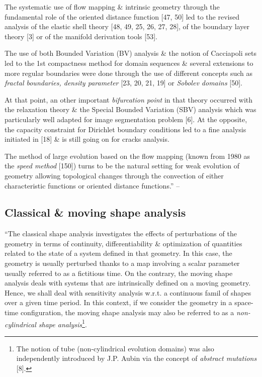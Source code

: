 \documentclass[oneside]{book}
\numberwithin{equation}{section}
\begin{document}
The systematic use of flow mapping \& intrinsic geometry through the fundamental role of the oriented distance function [47, 50] led to the revised analysis of the elastic shell theory [48, 49, 25, 26, 27, 28], of the boundary layer theory [3] or of the manifold derivation tools [53].

The use of both Bounded Variation (BV) analysis \& the notion of Cacciapoli sets led to the 1st compactness method for domain sequences \& several extensions to more regular boundaries were done through the use of different concepts such as \textit{fractal boundaries, density parameter} [23, 20, 21, 19] or \textit{Sobolev domains} [50].

At that point, an other important \textit{bifurcation point} in that theory occurred with the relaxation theory \& the Special Bounded Variation (SBV) analysis which was particularly well adapted for image segmentation problem [6]. At the opposite, the capacity constraint for Dirichlet boundary conditions led to a fine analysis initiated in [18] \& is still going on for cracks analysis.

The method of large evolution based on the flow mapping (known from 1980 as the \textit{speed method} [150]) turns to be the natural setting for weak evolution of geometry allowing topological changes through the convection of either characteristic functions or oriented distance functions.'' -- \cite[Chap. 1, pp. 1--3]{Moubachir_Zolesio2006}

\subsection{Classical \& moving shape analysis}
``The classical shape analysis investigates the effects of perturbations of the geometry in terms of continuity, differentiability \& optimization of quantities related to the state of a system defined in that geometry. In this case, the geometry is usually perturbed thanks to a map involving a scalar parameter usually referred to as a fictitious time. On the contrary, the moving shape analysis deals with systems that are intrinsically defined on a moving geometry. Hence, we shall deal with sensitivity analysis w.r.t. a continuous famil of shapes over a given time period. In this context, if we consider the geometry in a space-time configuration, the moving shape analysis may also be referred to as a \textit{non-cylindrical shape analysis}\footnote{The notion of tube (non-cylindrical evolution domains) was also independently introduced by J.P. Aubin via the concept of \textit{abstract mutations} [8].}.
\end{document}
